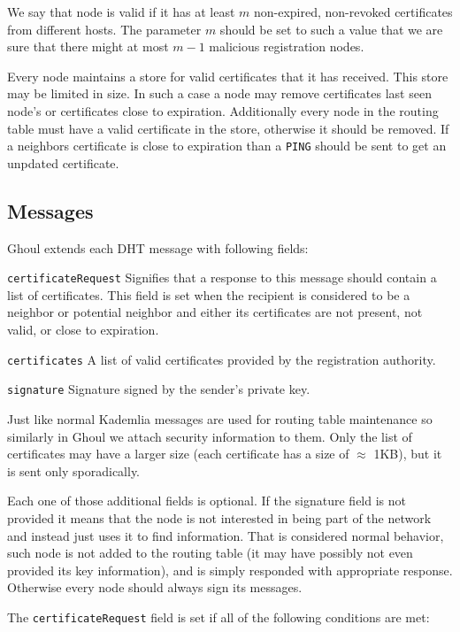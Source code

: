 We say that node is valid if it has at least $m$ non-expired, non-revoked
certificates from different hosts. The parameter $m$ should be set to such a
value that we are sure that there might at most $m-1$ malicious registration
nodes.

Every node maintains a store for valid certificates that it has received. This
store may be limited in size. In such a case a node may remove certificates last
seen node's or certificates close to expiration. Additionally every node in the
routing table must have a valid certificate in the store, otherwise it should be
removed. If a neighbors certificate is close to expiration than a \texttt{PING}
should be sent to get an unpdated certificate.

\subsection{Messages}
Ghoul extends each DHT message with following fields:
\begin{description}
  \item{\texttt{certificateRequest}} Signifies that a response to this message
    should contain a list of certificates. This field is set when the recipient
    is considered to be a neighbor or potential neighbor and either its
    certificates are not present, not valid, or close to expiration.
  \item{\texttt{certificates}} A list of valid certificates provided by the
    registration authority.
  \item{\texttt{signature}} Signature signed by the sender's private key.
\end{description}

Just like normal Kademlia messages are used for routing table maintenance so
similarly in Ghoul we attach security information to them. Only the list of
certificates may have a larger size (each certificate has a size of $\approx$
1KB), but it is sent only sporadically.

Each one of those additional fields is optional. If the signature field is not
provided it means that the node is not interested in being part of the network
and instead just uses it to find information. That is considered normal
behavior, such node is not added to the routing table (it may have possibly not
even provided its key information), and is simply responded with appropriate
response. Otherwise every node should always sign its messages.

The \texttt{certificateRequest} field is set if all of the following conditions
are met:

